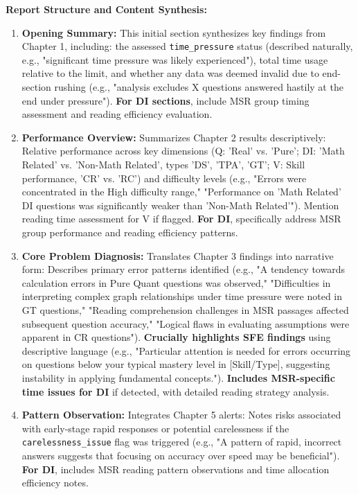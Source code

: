 \documentclass{article}
\begin{document}
\textbf{Report Structure and Content Synthesis:}
\begin{enumerate}
    \item \textbf{Opening Summary:} This initial section synthesizes key findings from Chapter 1, including: the assessed \texttt{time\_pressure} status (described naturally, e.g., "significant time pressure was likely experienced"), total time usage relative to the limit, and whether any data was deemed invalid due to end-section rushing (e.g., "analysis excludes X questions answered hastily at the end under pressure"). \textbf{For DI sections}, include MSR group timing assessment and reading efficiency evaluation.
    \item \textbf{Performance Overview:} Summarizes Chapter 2 results descriptively: Relative performance across key dimensions (Q: 'Real' vs. 'Pure'; DI: 'Math Related' vs. 'Non-Math Related', types 'DS', 'TPA', 'GT'; V: Skill performance, 'CR' vs. 'RC') and difficulty levels (e.g., "Errors were concentrated in the High difficulty range," "Performance on 'Math Related' DI questions was significantly weaker than 'Non-Math Related'"). Mention reading time assessment for V if flagged. \textbf{For DI}, specifically address MSR group performance and reading efficiency patterns.
    \item \textbf{Core Problem Diagnosis:} Translates Chapter 3 findings into narrative form: Describes primary error patterns identified (e.g., "A tendency towards calculation errors in Pure Quant questions was observed," "Difficulties in interpreting complex graph relationships under time pressure were noted in GT questions," "Reading comprehension challenges in MSR passages affected subsequent question accuracy," "Logical flaws in evaluating assumptions were apparent in CR questions"). \textbf{Crucially highlights SFE findings} using descriptive language (e.g., "Particular attention is needed for errors occurring on questions below your typical mastery level in [Skill/Type], suggesting instability in applying fundamental concepts."). \textbf{Includes MSR-specific time issues for DI} if detected, with detailed reading strategy analysis.
    \item \textbf{Pattern Observation:} Integrates Chapter 5 alerts: Notes risks associated with early-stage rapid responses or potential carelessness if the \texttt{carelessness\_issue} flag was triggered (e.g., "A pattern of rapid, incorrect answers suggests that focusing on accuracy over speed may be beneficial"). \textbf{For DI}, includes MSR reading pattern observations and time allocation efficiency notes.

\end{enumerate}
\end{document}
